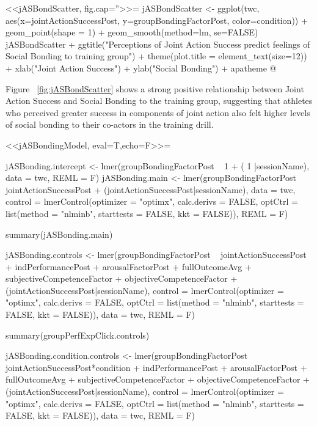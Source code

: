 

<<jASBondScatter, fig.cap=''>>=
jASBondScatter <- ggplot(twc, aes(x=jointActionSuccessPost, y=groupBondingFactorPost,
                            color=condition)) + geom_point(shape = 1) +
                            geom_smooth(method=lm, se=FALSE)
jASBondScatter +
            ggtitle("Perceptions of Joint Action Success \n predict feelings of Social Bonding to training group") +
            theme(plot.title = element_text(size=12)) +
            xlab("Joint Action Success") +
            ylab("Social Bonding") +
            apatheme
@

Figure ~\ref{fig:jASBondScatter} shows a strong positive relationship between Joint Action Success and Social Bonding to the training group, suggesting that athletes who perceived greater success in components of joint action also felt higher levels of social bonding to their co-actors in the training drill.


<<jASBondingModel, eval=T,echo=F>>=

jASBonding.intercept <- lmer(groupBondingFactorPost ~ 1 + ( 1 |sessionName),
                            data = twc,
                            REML = F)
jASBonding.main <- lmer(groupBondingFactorPost ~ jointActionSuccessPost +
                            (jointActionSuccessPost|sessionName),
                            data = twc,
                            control = lmerControl(optimizer = "optimx", calc.derivs = FALSE, optCtrl = list(method = "nlminb", starttests = FALSE, kkt = FALSE)),
                            REML = F)

summary(jASBonding.main)

jASBonding.controls <- lmer(groupBondingFactorPost ~ jointActionSuccessPost +
                            indPerformancePost + arousalFactorPost + fullOutcomeAvg +
                            subjectiveCompetenceFactor + objectiveCompetenceFactor +
                            (jointActionSuccessPost|sessionName),
                            control = lmerControl(optimizer = "optimx", calc.derivs = FALSE, optCtrl = list(method = "nlminb", starttests = FALSE, kkt = FALSE)),
                            data = twc,
                            REML = F)

summary(groupPerfExpClick.controls)

jASBonding.condition.controls <- lmer(groupBondingFactorPost ~
                            jointActionSuccessPost*condition +
                            indPerformancePost + arousalFactorPost + fullOutcomeAvg +
                            subjectiveCompetenceFactor + objectiveCompetenceFactor +
                            (jointActionSuccessPost|sessionName),
                            control = lmerControl(optimizer = "optimx", calc.derivs = FALSE, optCtrl = list(method = "nlminb", starttests = FALSE, kkt = FALSE)),
                            data = twc,
                            REML = F)

